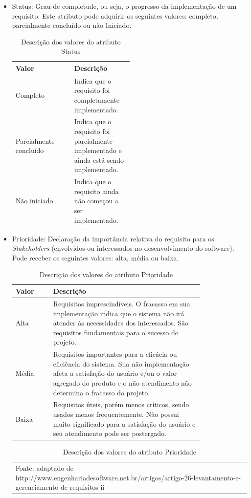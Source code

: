 \begin{itemize}
\item Status:
Grau de completude, ou seja, o progresso da implementação de um requisito. Este atributo pode adquirir os seguintes valores: completo, parcialmente concluído ou não Iniciado.

\begin{table}[h]
\centering
\caption{Descrição dos valores do atributo Status}
\label{Rotulo}
\begin{tabular}{ | l | p{0.5\linewidth} | }
\hline
\textbf{Valor} & \textbf{Descrição} \\ \hline
Completo &  Indica que o requisito foi completamente implementado. \\ \hline
Parcialmente concluído & Indica que o requisito foi parcialmente implementado e ainda está sendo implementado. \\ \hline
Não iniciado & Indica que o requisito ainda não começou a ser implementado. \\ \hline
\end{tabular}
\end{table}


\item Prioridade:
Declaração da importância relativa do requisito para os \textit{Stakeholders} (envolvidos ou interessados no desenvolvimento do software). Pode receber os seguintes valores: alta, média ou baixa.

\begin{table}[h]
\centering
\caption{Descrição dos valores do atributo Prioridade}
\label{Rotulo}
\begin{tabular}{ | l | p{0.8\linewidth} | }
\hline
\textbf{Valor} & \textbf{Descrição} \\ \hline
Alta &  Requisitos imprescindíveis. O fracasso em sua implementação indica que o sistema não irá atender às necessidades dos interessados. São requisitos fundamentais para o sucesso do projeto. \\ \hline
Média & Requisitos importantes para a eficácia ou eficiência do sistema. Sua não implementação afeta a satisfação do usuário e/ou o valor agregado do produto e o não atendimento não determina o fracasso do projeto. \\ \hline
Baixa & Requisitos úteis, porém menos críticos, sendo usados menos frequentemente. Não possui muito significado para a satisfação do usuário e seu atendimento pode ser postergado. \\ \hline
\end{tabular}
\begin{tabular} { l }
\tiny Fonte: adaptado de  http://www.engenhariadesoftware.net.br/artigos/artigo-26-levantamento-e-gerenciamento-de-requisitos-ii 
\end{tabular}
\end{table}


\end{itemize}
